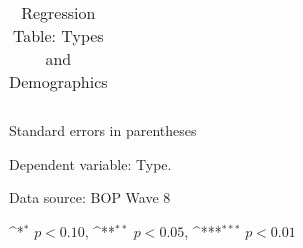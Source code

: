 \begin{table}[htbp]\centering
	\def\sym#1{\ifmmode^{#1}\else\(^{#1}\)\fi}
	\caption{Regression Table: Types and Demographics \label{tab:regression_types_dem}}
	\begin{threeparttable}
	\begin{tabular}{l*{4}{c}}
		\hline
		
		\hline\hline
	\end{tabular}
	\begin{tablenotes}\footnotesize
		\item[] Standard errors in parentheses
		\item[] Dependent variable: Type.
		\item[] Data source: BOP Wave 8
		\item[] \sym{*} \(p<0.10\), \sym{**} \(p<0.05\), \sym{***} \(p<0.01\)
	\end{tablenotes}
	\end{threeparttable}

\end{table}